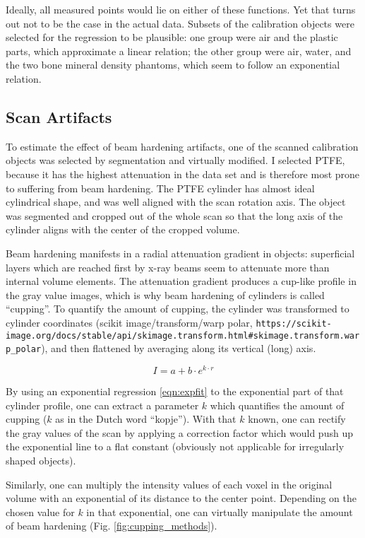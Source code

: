 Ideally, all measured points would lie on either of these functions.
Yet that turns out not to be the case in the actual data.
Subsets of the calibration objects were selected for the regression to be plausible: one group were air and the plastic parts, which approximate a linear relation; the other group were air, water, and the two bone mineral density phantoms, which seem to follow an exponential relation.


\subsection{Scan Artifacts}
\label{sec:org29e91b5}
To estimate the effect of beam hardening artifacts, one of the scanned calibration objects was selected by segmentation and virtually modified.
I selected PTFE, because it has the highest attenuation in the data set and is therefore most prone to suffering from beam hardening.
The PTFE cylinder has almost ideal cylindrical shape, and was well aligned with the scan rotation axis.
The object was segmented and cropped out of the whole scan so that the long axis of the cylinder aligns with the center of the cropped volume.


Beam hardening manifests in a radial attenuation gradient in objects: superficial layers which are reached first by x-ray beams seem to attenuate more than internal volume elements.
The attenuation gradient produces a cup-like profile in the gray value images, which is why beam hardening of cylinders is called ``cupping''.
To quantify the amount of cupping, the cylinder was transformed to cylinder coordinates (scikit image/transform/warp polar, \nolinkurl{https://scikit-image.org/docs/stable/api/skimage.transform.html#skimage.transform.warp_polar}), and then flattened by averaging along its vertical (long) axis.

\begin{equation}\label{eqn:expfit}
 I = a+b\cdot e^{k\cdot r}
\end{equation}

By using an exponential regression \eqref{eqn:expfit} to the exponential part of that cylinder profile, one can extract a parameter \(k\) which quantifies the amount of cupping (\(k\) as in the Dutch word ``kopje'').
With that \(k\) known, one can rectify the gray values of the scan by applying a correction factor which would push up the exponential line to a flat constant (obviously not applicable for irregularly shaped objects).

Similarly, one can multiply the intensity values of each voxel in the original volume with an exponential of its distance to the center point.
Depending on the chosen value for \(k\) in that exponential, one can virtually manipulate the amount of beam hardening (Fig. \ref{fig:cupping_methods}).



